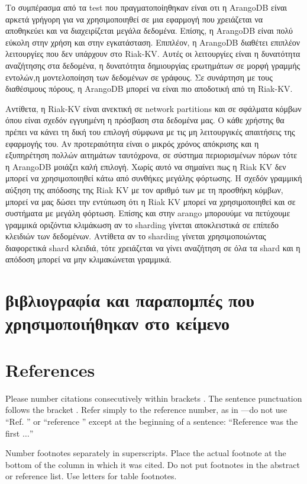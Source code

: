 \documentclass[conference]{IEEEtran}
\begin{document}
Το συμπέρασμα από τα test που πραγματοποίηθηκαν είναι οτι η ArangoDB είναι
αρκετά γρήγορη για να χρησιμοποιηθεί σε μια εφαρμογή που χρειάζεται να αποθηκεύει
και να διαχειρίζεται μεγάλα δεδομένα. Επίσης, η ArangoDB είναι πολύ εύκολη στην
χρήση και στην εγκατάσταση. Επιπλέον, η ArangoDB διαθέτει επιπλέον λειτουργίες
που δεν υπάρχουν στο Riak-KV.
Αυτές οι λειτουργίες είναι η δυνατότητα
αναζήτησης στα δεδομένα, η δυνατότητα δημιουργίας ερωτημάτων σε μορφή
γραμμής εντολών,η μοντελοποίηση των δεδομένων σε γράφους. 
Σε συνάρτηση με τους διαθέσιμους πόρους, η ArangoDB μπορεί να
είναι πιο αποδοτική από τη  Riak-KV. 

Αντίθετα, η Riak-KV είναι ανεκτική σε 
network partitions και σε σφάλματα κόμβων όπου είναι σχεδόν εγγυημένη η πρόσβαση
στα δεδομένα μας. Ο κάθε χρήστης θα πρέπει να κάνει τη δική του επιλογή 
σύμφωνα με τις μη λειτουργικές απαιτήσεις της εφαρμογής του. Αν προτεραιότητα είναι ο μικρός 
χρόνος απόκρισης και η εξυπηρέτηση πολλών αιτημάτων ταυτόχρονα, σε σύστημα περιορισμένων πόρων
τότε η ArangoDB μοιάζει καλή επιλογή. Χωρίς αυτό να σημαίνει πως η Riak KV δεν μπορεί να χρησιμοποιηθεί
κάτω από συνθήκες μεγάλης φόρτωσης. Η σχεδόν γραμμική αύξηση της απόδοσης της Riak KV με τον αριθμό των
με τη προσθήκη κόμβων, μπορεί να μας δώσει την εντύπωση ότι η Riak KV μπορεί να χρησιμοποιηθεί και σε
συστήματα με μεγάλη φόρτωση. 
Επίσης και στην arango μπορουύμε να πετύχουμε γραμμικά οριζόντια κλιμάκωση αν το 
sharding γίνεται αποκλειστικά σε επίπεδο κλειδιών των δεδομένων. Αντίθετα αν το sharding γίνεται χρησιμοποιώντας 
διαφορετικά shard κλειδιά, τότε χρειάζεται να γίνει αναζήτηση σε όλα τα shard και η απόδοση 
μπορεί να μην κλιμακώνεται γραμμικά.
\section{βιβλιογραφία και παραπομπές που χρησιμοποιήθηκαν στο κείμενο}

\section*{References}

Please number citations consecutively within brackets \cite{b1}. The 
sentence punctuation follows the bracket \cite{b2}. Refer simply to the reference 
number, as in \cite{b3}---do not use ``Ref. \cite{b3}'' or ``reference \cite{b3}'' except at 
the beginning of a sentence: ``Reference \cite{b3} was the first $\ldots$''

Number footnotes separately in superscripts. Place the actual footnote at 
the bottom of the column in which it was cited. Do not put footnotes in the 
abstract or reference list. Use letters for table footnotes.
\end{document}
